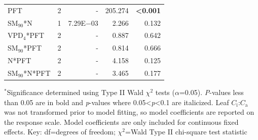 \begin{table}
\begin{tabular}{p{6cm}p{0.5cm}p{2cm}p{1.5cm}p{1.5cm}}
            PFT
            & \multicolumn{1}{r}{2}
            & \multicolumn{1}{r}{-}
            & \multicolumn{1}{r}{205.274}
            & \multicolumn{1}{r}{\textbf{<0.001}}
            \\

            SM$_{90}$*N
            & \multicolumn{1}{r}{1}
            & \multicolumn{1}{r}{7.29E$-$03}
            & \multicolumn{1}{r}{2.266}
            & \multicolumn{1}{r}{0.132}
            \\

            VPD$_{4}$*PFT
            & \multicolumn{1}{r}{2}
            & \multicolumn{1}{r}{-}
            & \multicolumn{1}{r}{0.887}
            & \multicolumn{1}{r}{0.642}
            \\

            SM$_{90}$*PFT
            & \multicolumn{1}{r}{2}
            & \multicolumn{1}{r}{-}
            & \multicolumn{1}{r}{0.814}
            & \multicolumn{1}{r}{0.666}
            \\

            N*PFT
            & \multicolumn{1}{r}{2}
            & \multicolumn{1}{r}{-}
            & \multicolumn{1}{r}{4.158}
            & \multicolumn{1}{r}{0.125}
            \\

            SM$_{90}$*N*PFT
            & \multicolumn{1}{r}{2}
            & \multicolumn{1}{r}{-}
            & \multicolumn{1}{r}{3.465}
            & \multicolumn{1}{r}{0.177}
            \\
            \hline
        \end{tabular}%
    \label{tab:table4.3}
\end{table}
\begin{singlespace}
    \noindent $^*$Significance determined using Type II Wald $\chi^{2}$ tests ($\alpha$=0.05). \textit{P}-values less than 0.05 are in bold and \textit{p}-values where 0.05<\textit{p}<0.1 are italicized. Leaf $C_\mathrm{i}$:$C_\mathrm{a}$ was not transformed prior to model fitting, so model coefficients are reported on the response scale. Model coefficients are only included for continuous fixed effects. Key: df=degrees of freedom; $\chi^2$=Wald Type II chi-square test statistic
\end{singlespace}
\clearpage

